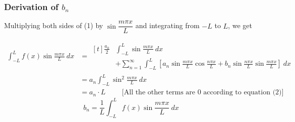 \documentclass[12pt]{article}
\begin{document}
\subsubsection{Derivation of $b_n$}
Multiplying both sides of (1) by $\sin{\dfrac{m\pi x}{L}}$ and integrating from $-L$ to $L$, we get

\begin{align*}
    \int_{-L}^{L} {f(x) \sin{\frac{m\pi x}{L}}} \: d{x} &=
    \begin{aligned}[t]
        \frac{a_0}{2} &\int_{-L}^{L} {\sin{\frac{m\pi x}{L}}} \: d{x} \\
        & + \sum_{n=1}^{\infty} \int_{-L}^{L} \left[ a_n \sin{\frac{m\pi x}{L}} \cos{\frac{n\pi x}{L}} + b_n \sin{\frac{n\pi x}{L}} \sin{\frac{m\pi x}{L}} \right] \: d{x}
    \end{aligned} \\
    &= a_n \int_{-L}^{L} {\sin^2{\frac{m\pi x}{L}}} \: d{x} \\
    &= a_n \cdot L \qquad \text{ [All the other terms are $0$ according to equation (2)] }
\end{align*}
\[ \boxed{ b_n = \frac{1}{L} \int_{-L}^{L} {f(x) \sin{\frac{m\pi x}{L}}} \: d{x} } \]
\end{document}
